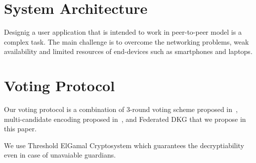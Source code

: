 \documentclass{article}
\begin{document}
\section{System Architecture}
Designig a user application that is intended to work in peer-to-peer model is a complex task. The main challenge is to overcome the networking problems, weak availability and limited resources of end-devices such as smartphones and laptops.

\section{Voting Protocol}
Our voting protocol is a combination of 3-round voting scheme proposed in~\cite{schoenmakersLectureNotesCryptographic2018}, multi-candidate encoding proposed in~\cite{haoAnonymousVotingTworound2010}, and Federated DKG that we propose in this paper. 

We use Threshold ElGamal Cryptosystem which guarantees the decryptiability even in case of unavaiable guardians.
\end{document}
